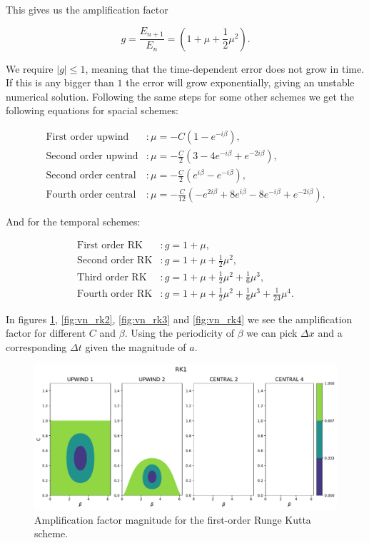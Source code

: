 \documentclass{article}
\begin{document}
This gives us the amplification factor 

\begin{equation}
    g = \frac{E_{n+1}}{E_n} = \left( 1 + \mu + \frac{1}{2}\mu^2  \right).
\end{equation}

We require $|g|\leq 1$, meaning that the time-dependent error does not grow in time. If this is any bigger than $1$ the error will grow exponentially, giving an unstable numerical solution. Following the same steps for some other schemes we get the following equations for spacial schemes:

\begin{align*}
    \text{First order upwind} &: \mu=-C\left(1-e^{-i\beta}\right),\\
    \text{Second order upwind} &: \mu=-\frac{C}{2}\left(3-4e^{-i\beta}+e^{-2i\beta}\right),\\
    \text{Second order central} &: \mu = -\frac{C}{2}\left(e^{i\beta} - e^{-i\beta}\right),\\
    \text{Fourth order central} &: \mu = - \frac{C}{12}\left(-e^{2i\beta}+8e^{i\beta}-8e^{-i\beta}+e^{-2i\beta}\right).
\end{align*}

And for the temporal schemes:

\begin{align*}
    \text{First order RK} &: g = 1+\mu,\\
    \text{Second order RK} &: g = 1+\mu + \frac{1}{2}\mu^2,\\
    \text{Third order RK} &: g = 1+\mu + \frac{1}{2}\mu^2+\frac{1}{6}\mu^3,\\
    \text{Fourth order RK} &: g = 1+\mu + \frac{1}{2}\mu^2+\frac{1}{6}\mu^3+\frac{1}{24}\mu^4.
\end{align*}

In figures \ref{fig:vn_rk1}, \ref{fig:vn_rk2}, \ref{fig:vn_rk3} and \ref{fig:vn_rk4} we see the amplification factor for different $C$ and $\beta$. Using the periodicity of $\beta$ we can pick $\Delta x$ and a corresponding $\Delta t$ given the magnitude of $a$.

\begin{figure}[htbp]
    \centering
    \includegraphics[width=0.8\linewidth]{./vn_rk1.pdf} %
    \caption{Amplification factor magnitude for the first-order Runge Kutta scheme.}
    \label{fig:vn_rk1} %
\end{figure}
\end{document}
